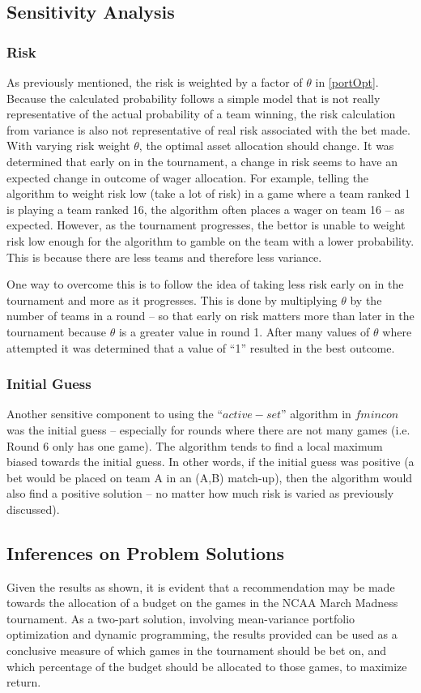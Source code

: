 \documentclass[12pt]{article}
\begin{document}
\subsection{Sensitivity Analysis}
\subsubsection{Risk}
As previously mentioned, the risk is weighted by a factor of $\theta$ in \eqref{portOpt}.
Because the calculated probability follows a simple model that is not really representative of the actual probability of a team winning, the risk calculation from variance is also not representative of real risk associated with the bet made. 
With varying risk weight $\theta$, the optimal asset allocation should change. 
It was determined that early on in the tournament, a change in risk seems to have an expected change in outcome of wager allocation.
For example, telling the algorithm to weight risk low (take a lot of risk) in a game where a team ranked 1 is playing a team ranked 16, the algorithm often places a wager on team 16 -- as expected.
However, as the tournament progresses, the bettor is unable to weight risk low enough for the algorithm to gamble on the team with a lower probability.
This is because there are less teams and therefore less variance.

One way to overcome this is to follow the idea of taking less risk early on in the tournament and more as it progresses.
This is done by multiplying $\theta$ by the number of teams in a round -- so that early on risk matters more than later in the tournament because $\theta$ is a greater value in round 1.
After many values of $\theta$ where attempted it was determined that a value of ``1'' resulted in the best outcome.

\subsubsection{Initial Guess}
Another sensitive component to using the ``$active-set$'' algorithm in $fmincon$ was the initial guess -- especially for rounds where there are not many games (i.e. Round 6 only has one game).
The algorithm tends to find a local maximum biased towards the initial guess.
In other words, if the initial guess was positive (a bet would be placed on team A in an (A,B) match-up), then the algorithm would also find a positive solution -- no matter how much risk is varied as previously discussed).

\subsection{Inferences on Problem Solutions}
Given the results as shown, it is evident that a recommendation may be made towards the allocation of a budget on the games in the NCAA March Madness tournament.
As a two-part solution, involving mean-variance portfolio optimization and dynamic programming, the results provided can be used as a conclusive measure of which games in the tournament should be bet on, and which percentage of the budget should be allocated to those games, to maximize return.
\end{document}
